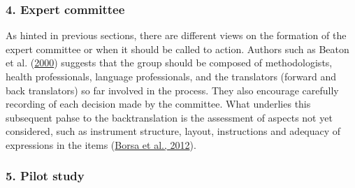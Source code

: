 \documentclass[
  ,doc,11pt, twoside,floatsintext]{apa6}
\begin{document}
\hypertarget{expert-committee}{%
\subsubsection{4. Expert committee}\label{expert-committee}}

As hinted in previous sections, there are different views on the formation of the expert committee or when it should be called to action. Authors such as Beaton et al. (\protect\hyperlink{ref-beaton2000}{2000}) suggests that the group should be composed of methodologists, health professionals, language professionals, and the translators (forward and back translators) so far involved in the process. They also encourage carefully recording of each decision made by the committee. What underlies this subsequent pahse to the backtranslation is the assessment of aspects not yet considered, such as instrument structure, layout, instructions and adequacy of expressions in the items (\protect\hyperlink{ref-borsaAdaptacaoValidacaoInstrumentos2012}{Borsa et al., 2012}).

\hypertarget{pilot-study}{%
\subsubsection{5. Pilot study}\label{pilot-study}}
\end{document}
